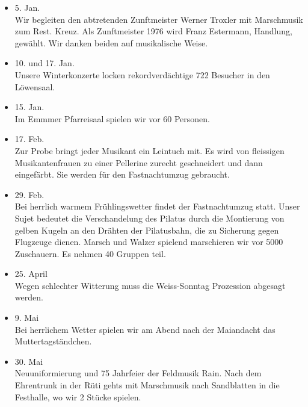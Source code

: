 \begin{multicols}{2}


    \begin{itemize}

        \item[]5. Jan.\\
        Wir begleiten den abtretenden Zunftmeister Werner Troxler mit Marschmusik zum Rest. Kreuz.
        Als Zunftmeister 1976 wird Franz Estermann, Handlung, gewählt.
        Wir danken beiden auf musikalische Weise.

        \item[]10. und 17. Jan.\\
        Unsere Winterkonzerte locken rekordverdächtige 722 Besucher in den Löwensaal.

        \item[]15. Jan.\\
        Im Emmmer Pfarreisaal spielen wir vor 60 Personen.

        \item[]17. Feb.\\
        Zur Probe bringt jeder Musikant ein Leintuch mit.
        Es wird von fleissigen Musikantenfrauen zu einer Pellerine zurecht geschneidert und dann eingefärbt.
        Sie werden für den Fastnachtumzug gebraucht.

        \item[]29. Feb.\\
        Bei herrlich warmem Frühlingswetter findet der Fastnachtumzug statt.
        Unser Sujet bedeutet die Verschandelung des Pilatus durch die Montierung von gelben Kugeln
        an den Drähten der Pilatusbahn, die zu Sicherung gegen Flugzeuge dienen.
        Marsch und Walzer spielend marschieren wir vor 5000 Zuschauern. Es nehmen 40 Gruppen teil.

        \item[]25. April\\
        Wegen schlechter Witterung muss die Weiss-Sonntag Prozession abgesagt werden.

        \item[]9. Mai\\
        Bei herrlichem Wetter spielen wir am Abend nach der Maiandacht das Muttertagständchen.

        \item[]30. Mai\\
        Neuuniformierung und 75 Jahrfeier der Feldmusik Rain. Nach dem Ehrentrunk in der Rüti
        gehts mit Marschmusik nach Sandblatten in die Festhalle, wo wir 2 Stücke spielen.


\end{itemize}
\end{multicols}
